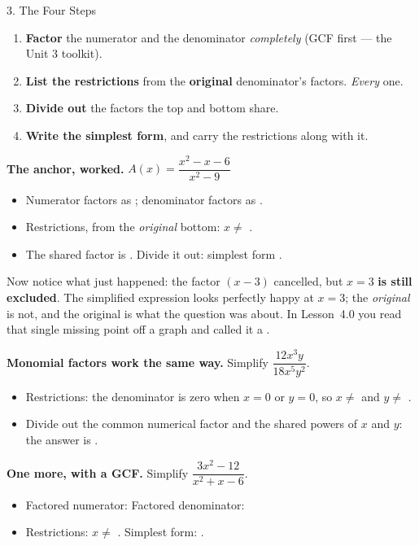 \documentclass[10pt]{article}
\begin{document}
\begin{notesbox}{3. The Four Steps}
\begin{enumerate}[leftmargin=1.9em, itemsep=2pt]
  \item \textbf{Factor} the numerator and the denominator \emph{completely} (GCF first --- the Unit 3 toolkit).
  \item \textbf{List the restrictions} from the \textbf{original} denominator's factors. \emph{Every} one.
  \item \textbf{Divide out} the factors the top and bottom share.
  \item \textbf{Write the simplest form}, and carry the restrictions along with it.
\end{enumerate}

\vspace{4pt}
\textbf{The anchor, worked.} $A(x)=\dfrac{x^2-x-6}{x^2-9}$
\begin{itemize}[leftmargin=1.5em, itemsep=3pt]
  \item Numerator factors as \blank{3.2cm}; \; denominator factors as \blank{3.2cm}.
  \item Restrictions, from the \emph{original} bottom: $x\neq$ \blank{2.4cm}.
  \item The shared factor is \blank{1.8cm}. Divide it out: simplest form \blank{2.4cm}.
\end{itemize}

\vspace{3pt}
Now notice what just happened: the factor $(x-3)$ cancelled, but $x=3$ \textbf{is still excluded}. The
simplified expression looks perfectly happy at $x=3$; the \emph{original} is not, and the original is
what the question was about. In Lesson~4.0 you read that single missing point off a graph and called
it a \blank{1.4cm}.

\vspace{5pt}
\textbf{Monomial factors work the same way.} Simplify $\dfrac{12x^3y}{18x^5y^2}$.
\begin{itemize}[leftmargin=1.5em, itemsep=3pt]
  \item Restrictions: the denominator is zero when $x=0$ or $y=0$, so $x\neq$ \blank{0.8cm} and
        $y\neq$ \blank{0.8cm}.
  \item Divide out the common numerical factor \blank{0.8cm} and the shared powers of $x$ and $y$:
        the answer is \blank{2.6cm}.
\end{itemize}

\vspace{4pt}
\textbf{One more, with a GCF.} Simplify $\dfrac{3x^2-12}{x^2+x-6}$.
\begin{itemize}[leftmargin=1.5em, itemsep=3pt]
  \item Factored numerator: \blank{3.6cm} \quad Factored denominator: \blank{3.6cm}
  \item Restrictions: $x\neq$ \blank{2.2cm}. \quad Simplest form: \blank{3.0cm}.
\end{itemize}
\end{notesbox}
\end{document}
